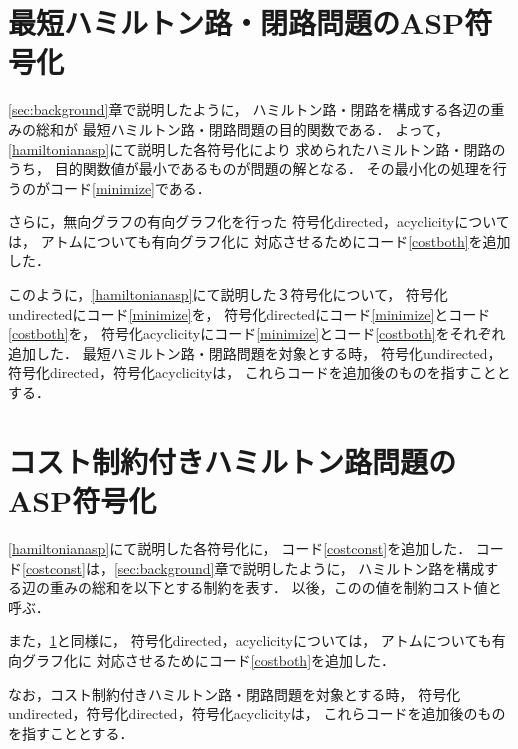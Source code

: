 \section{最短ハミルトン路・閉路問題のASP符号化}\label{minexpl}

\ref{sec:background}章で説明したように，
ハミルトン路・閉路を構成する各辺の重みの総和が
最短ハミルトン路・閉路問題の目的関数である．
よって，\ref{hamiltonianasp}にて説明した各符号化により
求められたハミルトン路・閉路のうち，
目的関数値が最小であるものが問題の解となる．
その最小化の処理を行うのがコード\ref{minimize}である．


さらに，無向グラフの有向グラフ化を行った
符号化directed，acyclicityについては，
アトムについても有向グラフ化に
対応させるためにコード\ref{costboth}を追加した．

このように，\ref{hamiltonianasp}にて説明した３符号化について，
符号化undirectedにコード\ref{minimize}を，
符号化directedにコード\ref{minimize}とコード\ref{costboth}を，
符号化acyclicityにコード\ref{minimize}とコード\ref{costboth}をそれぞれ追加した．
最短ハミルトン路・閉路問題を対象とする時，
符号化undirected，符号化directed，符号化acyclicityは，
これらコードを追加後のものを指すこととする．
\section{コスト制約付きハミルトン路問題のASP符号化}

\ref{hamiltonianasp}にて説明した各符号化に，
コード\ref{costconst}を追加した．
コード\ref{costconst}は，\ref{sec:background}章で説明したように，
ハミルトン路を構成する辺の重みの総和を以下とする制約を表す．
以後，このの値を制約コスト値と呼ぶ．

また，\ref{minexpl}と同様に，
符号化directed，acyclicityについては，
アトムについても有向グラフ化に
対応させるためにコード\ref{costboth}を追加した．

なお，コスト制約付きハミルトン路・閉路問題を対象とする時，
符号化undirected，符号化directed，符号化acyclicityは，
これらコードを追加後のものを指すこととする．
